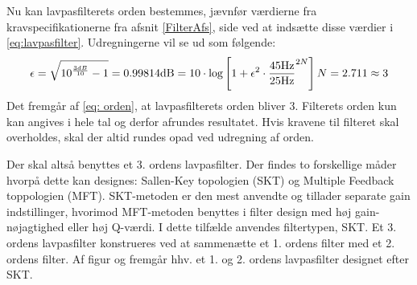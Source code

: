 Nu kan lavpasfilterets orden bestemmes, jævnfør værdierne fra kravspecifikationerne fra afsnit \ref{FilterAfs}, side \pageref{FilterAfs} ved at indsætte disse værdier i \eqref{eq:lavpasfilter}. Udregningerne vil se ud som følgende:
\begin{equation}
\epsilon = \sqrt{10^{\frac{3dB}{10}} - 1} = 0.998 \\ \label{eq:orden}
14\text{dB} = 10 \cdot \text{log} \left[1 + \epsilon ^2 \cdot \frac{45\text{Hz}}{25\text{Hz}}^{2N}\right] \\
N = 2.711 \approx 3
\end{equation}
\noindent Det fremgår af \eqref{eq: orden}, at lavpasfilterets orden bliver $3$. Filterets orden kun kan angives i hele tal og derfor afrundes resultatet. Hvis kravene til filteret skal overholdes, skal der altid rundes opad ved udregning af orden.

Der skal altså benyttes et 3. ordens lavpasfilter. Der findes to forskellige måder hvorpå dette kan designes: Sallen-Key topologien (SKT) og Multiple Feedback toppologien (MFT). SKT-metoden er den mest anvendte og tillader separate gain indstillinger, hvorimod MFT-metoden benyttes i filter design med høj gain-nøjagtighed eller høj Q-værdi. I dette tilfælde anvendes filtertypen, SKT. Et 3. ordens lavpasfilter konstrueres ved at sammenætte et 1. ordens filter med et 2. ordens filter. Af figur  og  fremgår hhv. et 1. og 2. ordens lavpasfilter designet efter SKT. \cite{Carter2013}
	
